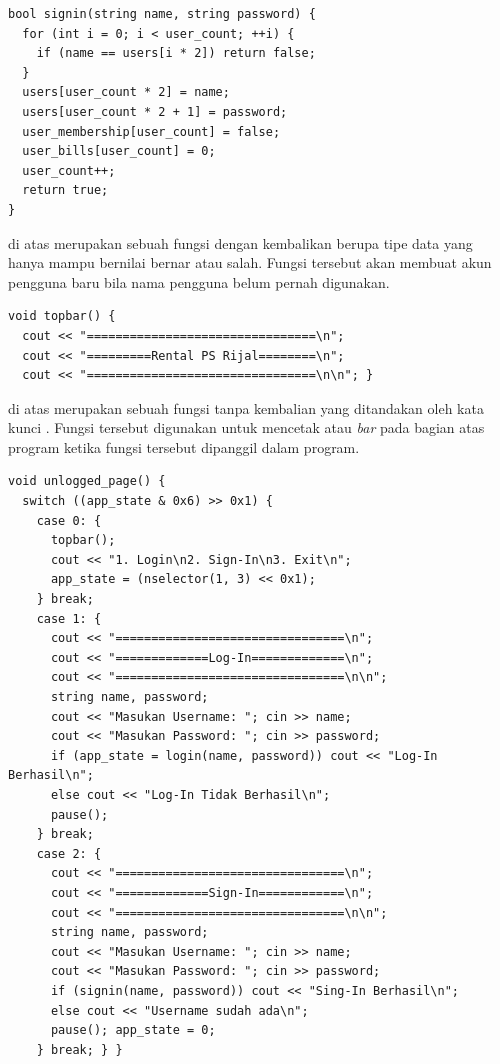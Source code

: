 \documentclass[../main.tex]{subfiles}
\begin{document}
\begin{code}
\begin{verbatim}
bool signin(string name, string password) {
  for (int i = 0; i < user_count; ++i) {
    if (name == users[i * 2]) return false;
  }
  users[user_count * 2] = name;
  users[user_count * 2 + 1] = password;
  user_membership[user_count] = false;
  user_bills[user_count] = 0;
  user_count++;
  return true;
}
\end{verbatim}
\end{code}

{\Script} di atas merupakan sebuah fungsi dengan kembalikan berupa tipe data  yang hanya mampu bernilai bernar atau salah. Fungsi tersebut akan membuat akun pengguna baru bila nama pengguna belum pernah digunakan.

\begin{code}
\begin{verbatim}
void topbar() {
  cout << "================================\n";
  cout << "=========Rental PS Rijal========\n";
  cout << "================================\n\n"; }
\end{verbatim}
\end{code}

{\Script} di atas merupakan sebuah fungsi tanpa kembalian yang ditandakan oleh kata kunci . Fungsi tersebut digunakan untuk mencetak {\header} atau \textit{bar} pada bagian atas program ketika fungsi tersebut dipanggil dalam program.

\begin{code}
\begin{verbatim}
void unlogged_page() {
  switch ((app_state & 0x6) >> 0x1) {
    case 0: {
      topbar();
      cout << "1. Login\n2. Sign-In\n3. Exit\n";
      app_state = (nselector(1, 3) << 0x1);
    } break;
    case 1: {
      cout << "================================\n";
      cout << "=============Log-In=============\n";
      cout << "================================\n\n";
      string name, password;
      cout << "Masukan Username: "; cin >> name;
      cout << "Masukan Password: "; cin >> password;
      if (app_state = login(name, password)) cout << "Log-In Berhasil\n";
      else cout << "Log-In Tidak Berhasil\n";
      pause();
    } break;
    case 2: {
      cout << "================================\n";
      cout << "=============Sign-In============\n";
      cout << "================================\n\n";
      string name, password;
      cout << "Masukan Username: "; cin >> name;
      cout << "Masukan Password: "; cin >> password;
      if (signin(name, password)) cout << "Sing-In Berhasil\n";
      else cout << "Username sudah ada\n";
      pause(); app_state = 0;
    } break; } }
\end{verbatim}
\end{code}
\end{document}
